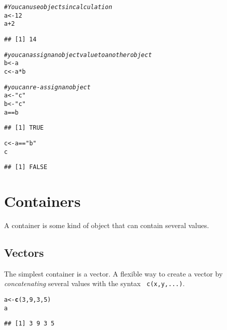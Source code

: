 \documentclass[12pt,a4paper]{scrartcl}\usepackage[]{graphicx}\usepackage[]{color}
\makeatletter
\newcommand{\hlnum}[1]{\textcolor[rgb]{0.686,0.059,0.569}{#1}}%
\newcommand{\hlstr}[1]{\textcolor[rgb]{0.192,0.494,0.8}{#1}}%
\newcommand{\hlcom}[1]{\textcolor[rgb]{0.678,0.584,0.686}{\textit{#1}}}%
\newcommand{\hlopt}[1]{\textcolor[rgb]{0,0,0}{#1}}%
\newcommand{\hlstd}[1]{\textcolor[rgb]{0.345,0.345,0.345}{#1}}%
\newcommand{\hlkwb}[1]{\textcolor[rgb]{0.69,0.353,0.396}{#1}}%
\newcommand{\hlkwd}[1]{\textcolor[rgb]{0.737,0.353,0.396}{\textbf{#1}}}%
\newenvironment{kframe}{%
 \def\at@end@of@kframe{}%
 \ifinner\ifhmode%
  \def\at@end@of@kframe{\end{minipage}}%
  \begin{minipage}{\columnwidth}%
 \fi\fi%
 \def\FrameCommand##1{\hskip\@totalleftmargin \hskip-\fboxsep
 \colorbox{shadecolor}{##1}\hskip-\fboxsep
     \hskip-\linewidth \hskip-\@totalleftmargin \hskip\columnwidth}%
 \MakeFramed {\advance\hsize-\width
   \@totalleftmargin\z@ \linewidth\hsize
   \@setminipage}}%
 {\par\unskip\endMakeFramed%
 \at@end@of@kframe}
\newenvironment{knitrout}{}{} %
\makeatother
\begin{document}
\begin{knitrout}
\color{fgcolor}\begin{kframe}
\begin{alltt}
\hlcom{#You can use objects in calculation}
\hlstd{a} \hlkwb{<-} \hlnum{12}
\hlstd{a} \hlopt{+} \hlnum{2}
\end{alltt}
\begin{verbatim}
## [1] 14
\end{verbatim}
\begin{alltt}
\hlcom{# you can assign an object value to another object}
\hlstd{b} \hlkwb{<-} \hlstd{a}
\hlstd{c} \hlkwb{<-} \hlstd{a}\hlopt{*}\hlstd{b}

\hlcom{# you can re-assign an object}
\hlstd{a} \hlkwb{<-} \hlstr{"c"}
\hlstd{b} \hlkwb{<-} \hlstr{"c"}
\hlstd{a} \hlopt{==} \hlstd{b}
\end{alltt}
\begin{verbatim}
## [1] TRUE
\end{verbatim}
\begin{alltt}
\hlstd{c} \hlkwb{<-} \hlstd{a} \hlopt{==} \hlstr{"b"}
\hlstd{c}
\end{alltt}
\begin{verbatim}
## [1] FALSE
\end{verbatim}
\end{kframe}
\end{knitrout}

\section{Containers}
A container is some kind of object that can contain several values.

\subsection{Vectors}
The simplest container is a vector.
A flexible way to create a vector by \textit{concatenating} several values with the syntax \verb+ c(x,y,...)+.

\begin{knitrout}
\color{fgcolor}\begin{kframe}
\begin{alltt}
\hlstd{a} \hlkwb{<-} \hlkwd{c}\hlstd{(}\hlnum{3}\hlstd{,}\hlnum{9}\hlstd{,}\hlnum{3}\hlstd{,}\hlnum{5}\hlstd{)}
\hlstd{a}
\end{alltt}
\begin{verbatim}
## [1] 3 9 3 5
\end{verbatim}
\end{kframe}
\end{knitrout}
\end{document}
